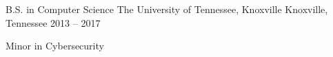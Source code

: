 

\begin{cventries}

  \cventry
    {B.S. in Computer Science} %
    {The University of Tennessee, Knoxville} %
    {Knoxville, Tennessee} %
    {2013 -- 2017} %
     {
      \begin{cvitems} %
        \item {Minor in Cybersecurity}
      \end{cvitems}
    }

\end{cventries}
